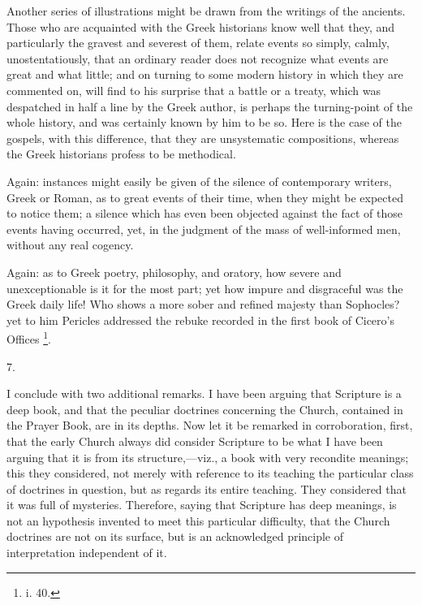 Another series of illustrations might be drawn from the writings of
the ancients. Those who are acquainted with the Greek historians know
well that they, and particularly the gravest and severest of them,
relate events so simply, calmly, unostentatiously, that an ordinary
reader does not recognize what events are great and what little;
and on turning to some modern history in which they are commented on,
will find to his surprise that a battle or a treaty, which was
despatched in half a line by the Greek author, is perhaps the
turning-point of the whole history, and was certainly known by him to
be so. Here is the case of the gospels, with this difference, that
they are unsystematic compositions, whereas the Greek historians
profess to be methodical.

Again: instances might easily be given of the silence of
contemporary writers, Greek or Roman, as to great events of their
time, when they might be expected to notice them; a silence which has
even been objected against the fact of those events having occurred,
yet, in the judgment of the mass of well-informed men, without any
real cogency.

Again: as to Greek poetry, philosophy, and oratory, how severe and
unexceptionable is it for the most part; yet how impure and
disgraceful was the Greek daily life! Who shows a more sober and
refined majesty than Sophocles? yet to him Pericles addressed the
rebuke recorded in the first book of Cicero's Offices \footnote{i. 40.}.

7.

I conclude with two additional remarks. I have been arguing that
Scripture is a deep book, and that the peculiar doctrines concerning
the Church, contained in the Prayer Book, are in its depths. Now let
it be remarked in corroboration, first, that the early Church always
did consider Scripture to be what I have been arguing that it is from
its structure,—viz., a book with very recondite meanings; this they
considered, not merely with reference to its teaching the particular
class of doctrines in question, but as regards its entire teaching.
They considered that it was full of mysteries. Therefore, saying
that Scripture has deep meanings, is not an hypothesis invented to
meet this particular difficulty, that the Church doctrines are not on
its surface, but is an acknowledged principle of interpretation
independent of it.

